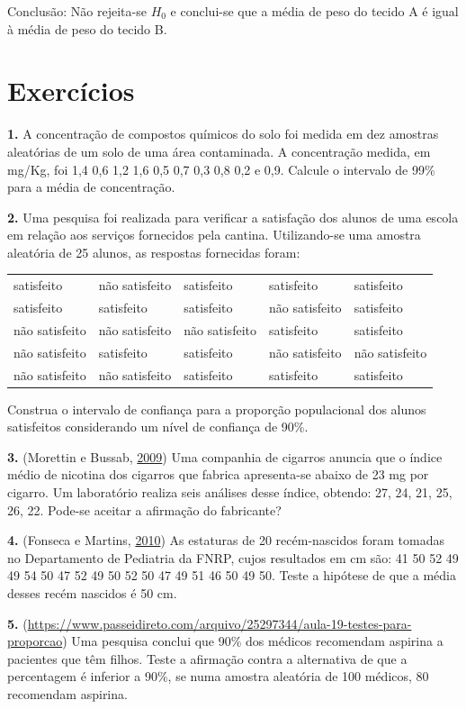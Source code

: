 \documentclass[12pt,brazil,oneside]{book}
\begin{document}
Conclusão: Não rejeita-se \(H_0\) e conclui-se que a média de peso do tecido A é igual à média de peso do tecido B.

\hypertarget{exercicios-2}{%
\section{Exercícios}\label{exercicios-2}}

\textbf{1.} A concentração de compostos químicos do solo foi medida em dez amostras aleatórias de um solo de uma área contaminada. A concentração medida, em mg/Kg, foi 1,4 0,6 1,2 1,6 0,5 0,7 0,3 0,8 0,2 e 0,9. Calcule o intervalo de 99\% para a média de concentração.

\textbf{2.} Uma pesquisa foi realizada para verificar a satisfação dos alunos de uma escola em relação aos serviços fornecidos pela cantina. Utilizando-se uma amostra aleatória de 25 alunos, as respostas fornecidas foram:

\begin{longtable}[]{@{}lllll@{}}
\toprule
\endhead
satisfeito & não satisfeito & satisfeito & satisfeito & satisfeito\tabularnewline
satisfeito & satisfeito & satisfeito & não satisfeito & satisfeito\tabularnewline
não satisfeito & não satisfeito & não satisfeito & satisfeito & satisfeito\tabularnewline
não satisfeito & satisfeito & satisfeito & não satisfeito & não satisfeito\tabularnewline
não satisfeito & não satisfeito & satisfeito & satisfeito & satisfeito\tabularnewline
\bottomrule
\end{longtable}

Construa o intervalo de confiança para a proporção populacional dos alunos satisfeitos considerando um nível de confiança de 90\%.

\textbf{3.} (Morettin e Bussab, \protect\hyperlink{ref-Morettin2009}{2009}) Uma companhia de cigarros anuncia que o índice médio de nicotina dos cigarros que fabrica apresenta-se abaixo de 23 mg por cigarro. Um laboratório realiza seis análises desse índice, obtendo: 27, 24, 21, 25, 26, 22. Pode-se aceitar a afirmação do fabricante?

\textbf{4.} (Fonseca e Martins, \protect\hyperlink{ref-Fonseca2010}{2010}) As estaturas de 20 recém-nascidos foram tomadas no Departamento de Pediatria da FNRP, cujos resultados em cm são: 41 50 52 49 49 54 50 47 52 49 50 52 50 47 49 51 46 50 49 50. Teste a hipótese de que a média desses recém nascidos é 50 cm.

\textbf{5.} (\url{https://www.passeidireto.com/arquivo/25297344/aula-19-testes-para-proporcao}) Uma pesquisa conclui que 90\% dos médicos recomendam aspirina a pacientes que têm filhos. Teste a afirmação contra a alternativa de que a percentagem é inferior a 90\%, se numa amostra aleatória de 100 médicos, 80 recomendam aspirina.
\end{document}
